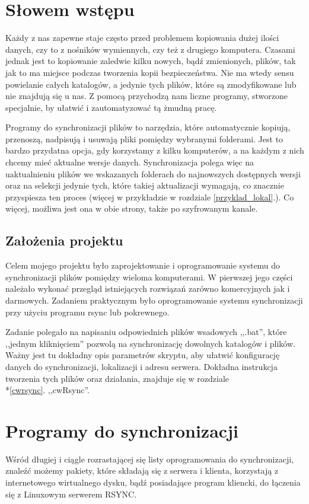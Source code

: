\section{Słowem wstępu}
Każdy z nas zapewne staje często przed problemem kopiowania dużej ilości danych, czy to z nośników wymiennych, czy też z drugiego komputera. Czasami jednak jest to kopiowanie zaledwie kilku nowych, bądź zmienionych, plików, tak jak to ma miejsce podczas tworzenia kopii bezpieczeństwa. Nie ma wtedy sensu powielanie całych katalogów, a jedynie tych plików, które są zmodyfikowane lub nie znajdują się u nas. Z pomocą przychodzą nam liczne programy, stworzone specjalnie, by ułatwić i zautomatyzować tą żmudną pracę. 

Programy do synchronizacji plików to narzędzia, które automatycznie kopiują, przenoszą, nadpisują i usuwają pliki pomiędzy wybranymi folderami. Jest to bardzo przydatna opcja, gdy korzystamy z kilku komputerów, a na każdym z nich chcemy mieć aktualne wersje danych. Synchronizacja polega więc na uaktualnieniu plików we wskazanych folderach do najnowszych dostępnych wersji oraz na selekcji jedynie tych, które takiej aktualizacji wymagają, co znacznie przyspiesza ten proces (więcej w przykładzie w rozdziale \ref{przyklad_lokal}.). Co więcej, możliwa jest ona w obie strony, także po szyfrowanym kanale.

\subsection{Założenia projektu}
Celem mojego projektu było zaprojektowanie i oprogramowanie systemu do synchronizacji plików pomiędzy wieloma komputerami. W pierwszej jego części należało wykonać przegląd istniejących rozwiązań zarówno komercyjnych jak i darmowych. Zadaniem praktycznym było oprogramowanie systemu synchronizacji przy użyciu programu rsync lub pokrewnego.

Zadanie polegało na napisaniu odpowiednich plików wsadowych ,,.bat'', które ,,jednym kliknięciem''  pozwolą na synchronizację dowolnych katalogów i plików. Ważny jest tu dokładny opis parametrów skryptu, aby ułatwić konfigurację danych do synchronizacji, lokalizacji i adresu serwera. Dokładna instrukcja tworzenia tych plików oraz działania, znajduje się w rozdziale \\*\ref{cwrsync}. ,,cwRsync''.

\section{Programy do synchronizacji}
\label{dosynch}
Wśród długiej i ciągle rozrastającej się listy oprogramowania do synchronizacji, znaleźć możemy pakiety, które składają się z serwera i klienta, korzystają z internetowego wirtualnego dysku, bądź posiadające program kliencki, do łączenia się z Linuxowym serwerem RSYNC.

